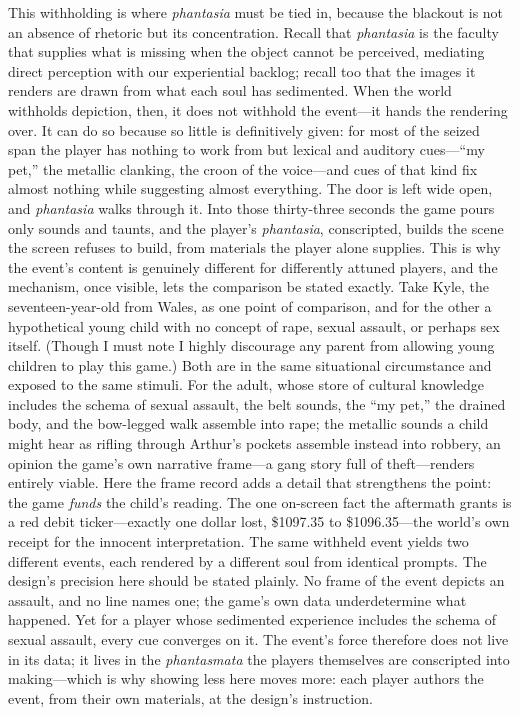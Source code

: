 \documentclass{article}
\begin{document}
This withholding is where \textit{phantasia} must be tied in, because the blackout is not an absence of rhetoric but its concentration. Recall that \textit{phantasia} is the faculty that supplies what is missing when the object cannot be perceived, mediating direct perception with our experiential backlog; recall too that the images it renders are drawn from what each soul has sedimented. When the world withholds depiction, then, it does not withhold the event---it hands the rendering over. It can do so because so little is definitively given: for most of the seized span the player has nothing to work from but lexical and auditory cues---``my pet,'' the metallic clanking, the croon of the voice---and cues of that kind fix almost nothing while suggesting almost everything. The door is left wide open, and \textit{phantasia} walks through it. Into those thirty-three seconds the game pours only sounds and taunts, and the player's \textit{phantasia}, conscripted, builds the scene the screen refuses to build, from materials the player alone supplies. This is why the event's content is genuinely different for differently attuned players, and the mechanism, once visible, lets the comparison be stated exactly. Take Kyle, the seventeen-year-old from Wales, as one point of comparison, and for the other a hypothetical young child with no concept of rape, sexual assault, or perhaps sex itself. (Though I must note I highly discourage any parent from allowing young children to play this game.) Both are in the same situational circumstance and exposed to the same stimuli. For the adult, whose store of cultural knowledge includes the schema of sexual assault, the belt sounds, the ``my pet,'' the drained body, and the bow-legged walk assemble into rape; the metallic sounds a child might hear as rifling through Arthur's pockets assemble instead into robbery, an opinion the game's own narrative frame---a gang story full of theft---renders entirely viable. Here the frame record adds a detail that strengthens the point: the game \textit{funds} the child's reading. The one on-screen fact the aftermath grants is a red debit ticker---exactly one dollar lost, \$1097.35 to \$1096.35---the world's own receipt for the innocent interpretation. The same withheld event yields two different events, each rendered by a different soul from identical prompts. The design's precision here should be stated plainly. No frame of the event depicts an assault, and no line names one; the game's own data underdetermine what happened. Yet for a player whose sedimented experience includes the schema of sexual assault, every cue converges on it. The event's force therefore does not live in its data; it lives in the \textit{phantasmata} the players themselves are conscripted into making---which is why showing less here moves more: each player authors the event, from their own materials, at the design's instruction.
\end{document}
